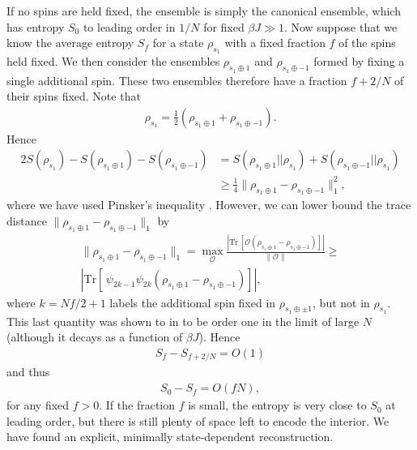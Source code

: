 \documentclass[12pt]{article}
\newcommand{\Tr}{\mathrm{Tr}}
\begin{document}
If no spins are held fixed, the ensemble is simply the canonical ensemble, which has entropy $S_0$ to leading order in $1/N$ for fixed $\beta J \gg 1$. Now suppose that we know the average entropy $S_f$ for a state $\rho_{s_1}$ with a fixed fraction $f$ of the spins held fixed. We then consider the ensembles $\rho_{s_1 \oplus 1}$ and $\rho_{s_1 \oplus -1}$ formed by fixing a single additional spin. These two ensembles therefore have a fraction $f+2/N$ of their spins fixed. Note that
\begin{align}
\rho_{s_1} = \frac{1}{2} \left( \rho_{s_1 \oplus 1} + \rho_{s_1 \oplus -1}\right).
\end{align}
Hence
\begin{align}
2 S(\rho_{s_1}) - S(\rho_{s_1 \oplus 1}) - S(\rho_{s_1 \oplus -1}) &=  S(\rho_{s_1 \oplus 1}|| \rho_{s_1}) + S(\rho_{s_1 \oplus -1}|| \rho_{s_1})
\\&\geq \frac{1}{4} \lVert \rho_{s_1 \oplus 1} - \rho_{s_1 \oplus -1} \rVert_1^2,
\end{align}
where we have used Pinsker's inequality \cite{ohya2004quantum}. However, we can lower bound the trace distance $\lVert \rho_{s_1 \oplus 1} - \rho_{s_1 \oplus -1} \rVert_1$ by
\begin{multline}
\lVert \rho_{s_1 \oplus 1} - \rho_{s_1 \oplus -1} \rVert_1 = \max_{\mathcal{O}} \frac{\left|\Tr{\,\left[\mathcal{O} \left(\rho_{s_1 \oplus 1} - \rho_{s_1 \oplus -1}\right)\right]}\right|}{\lVert \mathcal{O}\rVert} \geq \\
\left|\Tr \left[\,\psi_{2k-1} \psi_{2k} \left(\rho_{s_1 \oplus 1} - \rho_{s_1 \oplus -1}\right)\right]\right|,
\end{multline}
where $k = Nf/2 + 1$ labels the additional spin fixed in $\rho_{s_1 \oplus \pm 1}$, but not in $\rho_{s_1}$. This last quantity was shown to in \cite{kourkoulou2017pure} to be order one in the limit of large $N$ (although it decays as a function of $\beta J$). Hence
\begin{align}
S_f - S_{f+2/N} = O(1)
\end{align}
and thus
\begin{align}
S_0 - S_f = O(f N),
\end{align}
for any fixed $f > 0$. If the fraction $f$ is small, the entropy is very close to $S_0$ at leading order, but there is still plenty of space left to encode the interior. We have found an explicit, minimally state-dependent reconstruction.
\end{document}
